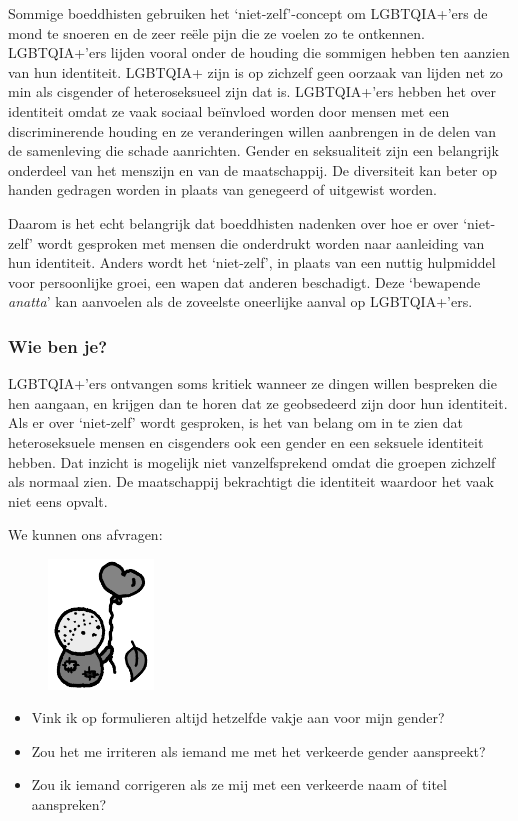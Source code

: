 \documentclass[12pt,openany]{book}
\begin{document}
Sommige boeddhisten gebruiken het `niet-zelf'-concept om LGBTQIA+'ers de mond te snoeren en de zeer reële pijn die ze voelen zo te ontkennen. LGBTQIA+'ers lijden vooral onder de houding die sommigen hebben ten aanzien van hun identiteit. LGBTQIA+ zijn is op zichzelf geen oorzaak van lijden net zo min als cisgender of heteroseksueel zijn dat is. LGBTQIA+'ers hebben het over identiteit omdat ze vaak sociaal beïnvloed worden door mensen met een discriminerende houding en ze veranderingen willen aanbrengen in de delen van de samenleving die schade aanrichten. Gender en seksualiteit zijn een belangrijk onderdeel van het menszijn en van de maatschappij. De diversiteit kan beter op handen gedragen worden in plaats van genegeerd of uitgewist worden. 

Daarom is het echt belangrijk dat boeddhisten nadenken over hoe er over `niet-zelf' wordt gesproken met mensen die onderdrukt worden naar aanleiding van hun identiteit. Anders wordt het `niet-zelf', in plaats van een nuttig hulpmiddel voor persoonlijke groei, een wapen dat anderen beschadigt. Deze `bewapende \textit{anatta}' kan aanvoelen als de zoveelste oneerlijke aanval op LGBTQIA+'ers.  

\subsubsection*{Wie ben je?}

LGBTQIA+'ers ontvangen soms kritiek wanneer ze dingen willen bespreken die hen aangaan, en krijgen dan te horen dat ze geobsedeerd zijn door hun identiteit. Als er over `niet-zelf' wordt gesproken, is het van belang om in te zien dat heteroseksuele mensen en cisgenders ook een gender en een seksuele identiteit hebben. Dat inzicht is mogelijk niet vanzelfsprekend omdat die groepen zichzelf als normaal zien. De maatschappij bekrachtigt die identiteit waardoor het vaak niet eens opvalt.

We kunnen ons afvragen:
\begin{figure}
    \centering
    \includegraphics[width=0.25\textwidth]{33bw.png}
\end{figure}
\begin{itemize}
\setlength\itemsep{-0.3em}
\item Vink ik op formulieren altijd hetzelfde vakje aan voor mijn gender?
\item Zou het me irriteren als iemand me met het verkeerde gender aanspreekt?
\item Zou ik iemand corrigeren als ze mij met een verkeerde naam of titel aanspreken?
\end{itemize}
\end{document}
